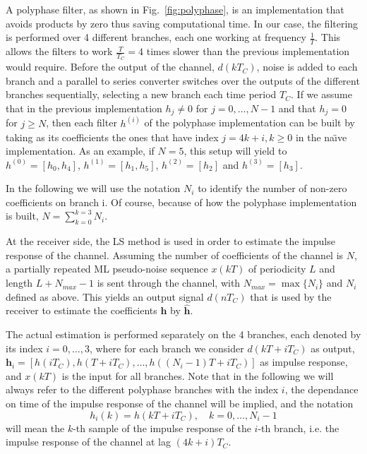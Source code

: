 \documentclass[10pt]{article}
\begin{document}
A polyphase filter, as shown in Fig.~\ref{fig:polyphase}, is an implementation that avoids products by zero thus saving computational time. In our case, the filtering is performed over 4 different branches, each one working at frequency $\frac{1}{T}$. This allows the filters to work $\frac{T}{T_C} = 4$ times slower than the previous implementation would require. Before the output of the channel, $d(kT_C)$, noise is added to each branch and a parallel to series converter switches over the outputs of the different branches sequentially, selecting a new branch each time period $T_C$. If we assume that in the previous implementation $h_j \ne 0$ for $j = 0, \dots, N - 1$ and that $h_j = 0$ for $j \ge N$, then each filter $h^{(i)}$ of the polyphase implementation can be built by taking as its coefficients the ones that have index $j = 4k + i, k \ge 0$ in the na\"{\i}ve implementation. As an example, if $N = 5$, this setup will yield to $h^{(0)} = [h_0, h_4]$, $h^{(1)} = [h_1, h_5]$, $h^{(2)} = [h_2]$ and $h^{(3)} = [h_3]$.

In the following we will use the notation $N_i$ to identify the number of non-zero coefficients on branch i. Of course, because of how the polyphase implementation is built, $N = \sum_{k = 0}^{k = 3} N_i$.

At the receiver side, the LS method is used in order to estimate the impulse response of the channel. Assuming the number of coefficients of the channel is $N$, a partially repeated ML pseudo-noise sequence $x(kT)$ of periodicity $L$ and length $L + N_{max} - 1$ is sent through the channel, with $N_{max} = \max \{N_i\}$ and $N_i$ defined as above. This yields an output signal $d(nT_C)$ that is used by the receiver to estimate the coefficients $\mathbf{h}$ by $\mathbf{\hat{h}}$.

The actual estimation is performed separately on the 4 branches, each denoted by its index $i = 0,\ldots,3$, where for each branch we consider $d(kT+iT_C)$ as output, $\mathbf{h}_i = [h(iT_C), h(T+iT_C), \ldots, h((N_i-1)T + iT_C)]$ as impulse response, and $x(kT)$ is the input for all branches. Note that in the following we will always refer to the different polyphase branches with the index $i$, the dependance on time of the impulse response of the channel will be implied, and the notation
\begin{equation}\label{eq:def_ir_branch}
h_i(k) = h(kT+iT_C), \quad k=0,\ldots,N_i-1
\end{equation}
will mean the $k$-th sample of the impulse response of the $i$-th branch, i.e. the impulse response of the channel at lag $(4k+i)T_C$.
\end{document}
